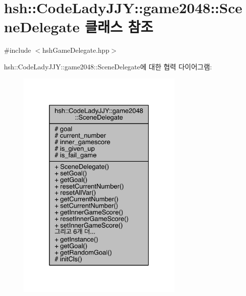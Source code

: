 \hypertarget{classhsh_1_1_code_lady_j_j_y_1_1game2048_1_1_scene_delegate}{}\section{hsh\+:\+:Code\+Lady\+J\+JY\+:\+:game2048\+:\+:Scene\+Delegate 클래스 참조}
\label{classhsh_1_1_code_lady_j_j_y_1_1game2048_1_1_scene_delegate}


{\ttfamily \#include $<$hsh\+Game\+Delegate.\+hpp$>$}



hsh\+:\+:Code\+Lady\+J\+JY\+:\+:game2048\+:\+:Scene\+Delegate에 대한 협력 다이어그램\+:
\nopagebreak
\begin{figure}[H]
\begin{center}
\leavevmode
\includegraphics[width=232pt]{classhsh_1_1_code_lady_j_j_y_1_1game2048_1_1_scene_delegate__coll__graph}
\end{center}
\end{figure}
